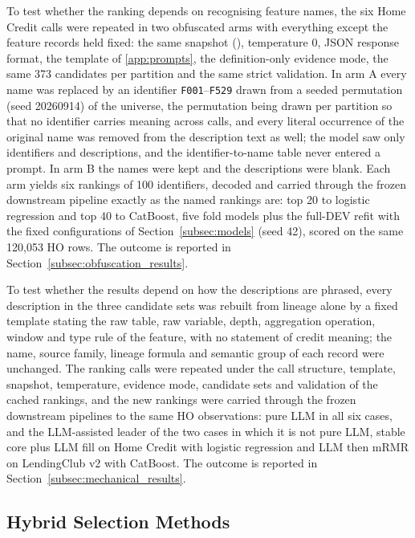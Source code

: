 \documentclass[final,5p,twocolumn]{elsarticle}
\begin{document}
To test whether the ranking depends on recognising feature names, the six Home Credit calls were repeated in two obfuscated arms with everything except the feature records held fixed: the same snapshot (), temperature 0, JSON response format, the template of \ref{app:prompts}, the definition-only evidence mode, the same 373 candidates per partition and the same strict validation. In arm A every name was replaced by an identifier \texttt{F001}--\texttt{F529} drawn from a seeded permutation (seed 20260914) of the universe, the permutation being drawn per partition so that no identifier carries meaning across calls, and every literal occurrence of the original name was removed from the description text as well; the model saw only identifiers and descriptions, and the identifier-to-name table never entered a prompt. In arm B the names were kept and the descriptions were blank. Each arm yields six rankings of 100 identifiers, decoded and carried through the frozen downstream pipeline exactly as the named rankings are: top 20 to logistic regression and top 40 to CatBoost, five fold models plus the full-DEV refit with the fixed configurations of Section~\ref{subsec:models} (seed 42), scored on the same 120,053 HO rows. The outcome is reported in Section~\ref{subsec:obfuscation_results}.

To test whether the results depend on how the descriptions are phrased, every description in the three candidate sets was rebuilt from lineage alone by a fixed template stating the raw table, raw variable, depth, aggregation operation, window and type rule of the feature, with no statement of credit meaning; the name, source family, lineage formula and semantic group of each record were unchanged. The ranking calls were repeated under the call structure, template, snapshot, temperature, evidence mode, candidate sets and validation of the cached rankings, and the new rankings were carried through the frozen downstream pipelines to the same HO observations: pure LLM in all six cases, and the LLM-assisted leader of the two cases in which it is not pure LLM, stable core plus LLM fill on Home Credit with logistic regression and LLM then mRMR on LendingClub v2 with CatBoost. The outcome is reported in Section~\ref{subsec:mechanical_results}.

\subsection{Hybrid Selection Methods}
\label{subsec:hybrid_fs}
\end{document}
